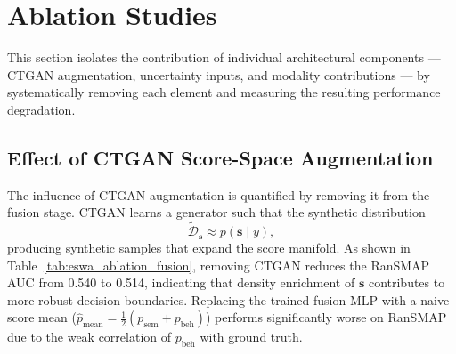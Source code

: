 \begin{table}[ht]
\centering
\caption{Measured inference latency and throughput per SABRE component (NVIDIA GB10 GPU, $T=10$ MC Dropout passes, $n=500$ repetitions). Full pipeline (B+S) is the serial sum of per-agent latencies plus fusion overhead.}
\label{tab:eswa_runtime}
\end{table}


\section{Ablation Studies}
\label{sec:eswa_ablation}

This section isolates the contribution of individual architectural components — CTGAN augmentation, uncertainty inputs, and modality contributions — by systematically removing each element and measuring the resulting performance degradation.

\subsection{Effect of CTGAN Score-Space Augmentation}

The influence of CTGAN augmentation is quantified by removing it from the fusion stage. CTGAN learns a generator such that the synthetic distribution
\begin{equation}
\tilde{\mathcal{D}}_\mathbf{s} \approx p(\mathbf{s} \mid y),
\label{eq:eswa_ctgan_dist}
\end{equation}
producing synthetic samples that expand the score manifold. As shown in Table~\ref{tab:eswa_ablation_fusion}, removing CTGAN reduces the RanSMAP AUC from 0.540 to 0.514, indicating that density enrichment of $\mathbf{s}$ contributes to more robust decision boundaries. Replacing the trained fusion MLP with a naive score mean ($\hat{p}_\text{mean} = \frac{1}{2}(p_\text{sem} + p_\text{beh})$) performs significantly worse on RanSMAP due to the weak correlation of $p_\text{beh}$ with ground truth.

